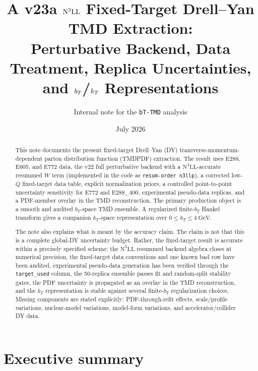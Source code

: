 \documentclass[11pt]{article}
\title{A v23a \texorpdfstring{$\NthreeLL$}{N3LL} Fixed-Target Drell--Yan TMD Extraction:\\Perturbative Backend, Data Treatment, Replica Uncertainties, and \texorpdfstring{$\bt$/$\kt$}{bT/kT} Representations}
\author{Internal note for the \texttt{bT-TMD} analysis}
\date{July 2026}
\newcommand{\bt}{b_T}
\newcommand{\kt}{k_T}
\newcommand{\GeV}{\mathrm{GeV}}
\newcommand{\NthreeLL}{\mathrm{N^{3}LL}}
\newcommand{\code}[1]{\texttt{#1}}
\begin{document}
\maketitle

\begin{abstract}
This note documents the present fixed-target Drell--Yan (DY) transverse-momentum-dependent parton distribution function (TMDPDF) extraction.  The result uses E288, E605, and E772 data, the v22 full perturbative backend with a $\NthreeLL$-accurate resummed $W$ term (implemented in the code as \code{resum-order n3llp}), a corrected low-$Q$ fixed-target data table, explicit normalization priors, a controlled point-to-point uncertainty sensitivity for E772 and E288\_400, experimental pseudo-data replicas, and a PDF-member overlay in the TMD reconstruction.  The primary production object is a smooth and audited $\bt$-space TMD ensemble.  A regularized finite-$\bt$ Hankel transform gives a companion $\kt$-space representation over $0\le \kt\le 4~\GeV$.

The note also explains what is meant by the accuracy claim.  The claim is not that this is a complete global-DY uncertainty budget.  Rather, the fixed-target result is accurate within a precisely specified scheme: the $\NthreeLL$ resummed backend algebra closes at numerical precision, the fixed-target data conventions and one known bad row have been audited, experimental pseudo-data generation has been verified through the \code{target\_used} column, the 50-replica ensemble passes fit and random-split stability gates, the PDF uncertainty is propagated as an overlay in the TMD reconstruction, and the $\kt$ representation is stable against several finite-$\bt$ regularization choices.  Missing components are stated explicitly: PDF-through-refit effects, scale/profile variations, nuclear-model variations, model-form variations, and accelerator/collider DY data.
\end{abstract}

\tableofcontents
\clearpage

\section{Executive summary}
\end{document}

